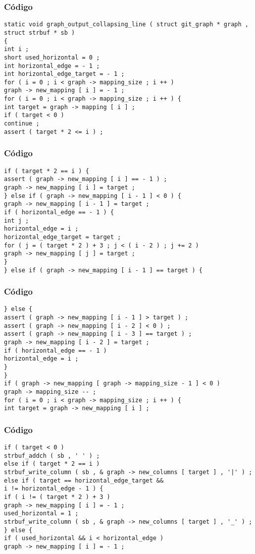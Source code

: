 \documentclass{beamer}
\begin{document}
\begin{frame}[fragile]
\frametitle{C\'odigo}
\begin{verbatim}
static void graph_output_collapsing_line ( struct git_graph * graph , struct strbuf * sb ) 
{ 
int i ; 
short used_horizontal = 0 ; 
int horizontal_edge = - 1 ; 
int horizontal_edge_target = - 1 ; 
for ( i = 0 ; i < graph -> mapping_size ; i ++ ) 
graph -> new_mapping [ i ] = - 1 ; 
for ( i = 0 ; i < graph -> mapping_size ; i ++ ) { 
int target = graph -> mapping [ i ] ; 
if ( target < 0 ) 
continue ; 
assert ( target * 2 <= i ) ; 
\end{verbatim}
\end{frame}
\begin{frame}[fragile]
\frametitle{C\'odigo}
\begin{verbatim}
if ( target * 2 == i ) { 
assert ( graph -> new_mapping [ i ] == - 1 ) ; 
graph -> new_mapping [ i ] = target ; 
} else if ( graph -> new_mapping [ i - 1 ] < 0 ) { 
graph -> new_mapping [ i - 1 ] = target ; 
if ( horizontal_edge == - 1 ) { 
int j ; 
horizontal_edge = i ; 
horizontal_edge_target = target ; 
for ( j = ( target * 2 ) + 3 ; j < ( i - 2 ) ; j += 2 ) 
graph -> new_mapping [ j ] = target ; 
} 
} else if ( graph -> new_mapping [ i - 1 ] == target ) { 
\end{verbatim}
\end{frame}
\begin{frame}[fragile]
\frametitle{C\'odigo}
\begin{verbatim}
} else { 
assert ( graph -> new_mapping [ i - 1 ] > target ) ; 
assert ( graph -> new_mapping [ i - 2 ] < 0 ) ; 
assert ( graph -> new_mapping [ i - 3 ] == target ) ; 
graph -> new_mapping [ i - 2 ] = target ; 
if ( horizontal_edge == - 1 ) 
horizontal_edge = i ; 
} 
} 
if ( graph -> new_mapping [ graph -> mapping_size - 1 ] < 0 ) 
graph -> mapping_size -- ; 
for ( i = 0 ; i < graph -> mapping_size ; i ++ ) { 
int target = graph -> new_mapping [ i ] ; 
\end{verbatim}
\end{frame}
\begin{frame}[fragile]
\frametitle{C\'odigo}
\begin{verbatim}
if ( target < 0 ) 
strbuf_addch ( sb , ' ' ) ; 
else if ( target * 2 == i ) 
strbuf_write_column ( sb , & graph -> new_columns [ target ] , '|' ) ; 
else if ( target == horizontal_edge_target && 
i != horizontal_edge - 1 ) { 
if ( i != ( target * 2 ) + 3 ) 
graph -> new_mapping [ i ] = - 1 ; 
used_horizontal = 1 ; 
strbuf_write_column ( sb , & graph -> new_columns [ target ] , '_' ) ; 
} else { 
if ( used_horizontal && i < horizontal_edge ) 
graph -> new_mapping [ i ] = - 1 ; 
\end{verbatim}
\end{frame}
\end{document}
